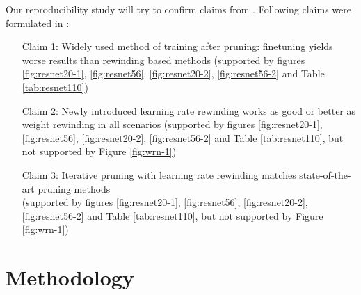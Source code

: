 Our reproducibility study will try to confirm claims from \cite{Renda}.
Following claims were formulated in \cite{Renda}:
\begin{itemize}
    \item [Claim 1:] Widely used method of training after pruning: finetuning yields worse results than rewinding based methods (supported by figures \ref{fig:resnet20-1}, \ref{fig:resnet56}, \ref{fig:resnet20-2}, \ref{fig:resnet56-2} and Table \ref{tab:resnet110})
    \item [Claim 2:] Newly introduced learning rate rewinding works as good or better as weight rewinding in all scenarios (supported by figures \ref{fig:resnet20-1}, \ref{fig:resnet56}, \ref{fig:resnet20-2}, \ref{fig:resnet56-2} and Table \ref{tab:resnet110}, but not supported by Figure \ref{fig:wrn-1})
    \item [Claim 3:] Iterative pruning with learning rate rewinding matches state-of-the-art pruning methods \\(supported by figures \ref{fig:resnet20-1}, \ref{fig:resnet56}, \ref{fig:resnet20-2}, \ref{fig:resnet56-2} and Table \ref{tab:resnet110}, but not supported by Figure \ref{fig:wrn-1})
\end{itemize}



\section{Methodology}

